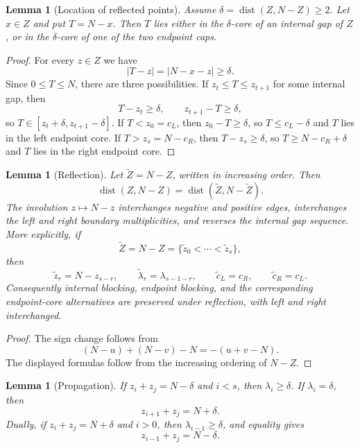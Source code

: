 \documentclass[11pt]{article}
\newtheorem{lemma}[theorem]{Lemma}
\newcommand{\dist}{\operatorname{dist}}
\begin{document}
\begin{lemma}[Location of reflected points]\label{lem:target-placement}
Assume $\delta=\dist(Z,N-Z)\ge2$.  Let $x\in Z$ and put $T=N-x$.  Then $T$ lies either in the $\delta$-core of an internal gap of $Z$, or in the $\delta$-core of one of the two endpoint caps.
\end{lemma}

\begin{proof}
For every $z\in Z$ we have
\[
        |T-z|=|N-x-z|\ge\delta.
\]
Since $0\le T\le N$, there are three possibilities.  If $z_t\le T\le z_{t+1}$ for some internal gap, then
\[
        T-z_t\ge\delta,
        \qquad
        z_{t+1}-T\ge\delta,
\]
so $T\in[z_t+\delta,z_{t+1}-\delta]$.  If $T<z_0=c_L$, then $z_0-T\ge\delta$, so $T\le c_L-\delta$ and $T$ lies in the left endpoint core.  If $T>z_s=N-c_R$, then $T-z_s\ge\delta$, so $T\ge N-c_R+\delta$ and $T$ lies in the right endpoint core.
\end{proof}

\begin{lemma}[Reflection]\label{lem:reflection}
Let $\widetilde Z=N-Z$, written in increasing order.  Then
\[
        \dist(Z,N-Z)=\dist(\widetilde Z,N-\widetilde Z).
\]
The involution $z\mapsto N-z$ interchanges negative and positive edges, interchanges the left and right boundary multiplicities, and reverses the internal gap sequence.  More explicitly, if
\[
        \widetilde Z=N-Z=\{\widetilde z_0<\cdots<\widetilde z_s\},
\]
then
\[
        \widetilde z_r=N-z_{s-r},
        \qquad
        \widetilde\lambda_r=\lambda_{s-1-r},
        \qquad
        \widetilde c_L=c_R,
        \qquad
        \widetilde c_R=c_L.
\]
Consequently internal blocking, endpoint blocking, and the corresponding endpoint-core alternatives are preserved under reflection, with left and right interchanged.
\end{lemma}

\begin{proof}
The sign change follows from
\[
        (N-u)+(N-v)-N=-(u+v-N).
\]
The displayed formulas follow from the increasing ordering of \(N-Z\).
\end{proof}

\begin{lemma}[Propagation]\label{lem:propagation}
If $z_i+z_j=N-\delta$ and $i<s$, then $\lambda_i\ge\delta$.  If $\lambda_i=\delta$, then
\[
        z_{i+1}+z_j=N+\delta.
\]
Dually, if $z_i+z_j=N+\delta$ and $i>0$, then $\lambda_{i-1}\ge\delta$, and equality gives
\[
        z_{i-1}+z_j=N-\delta.
\]
\end{lemma}
\end{document}
